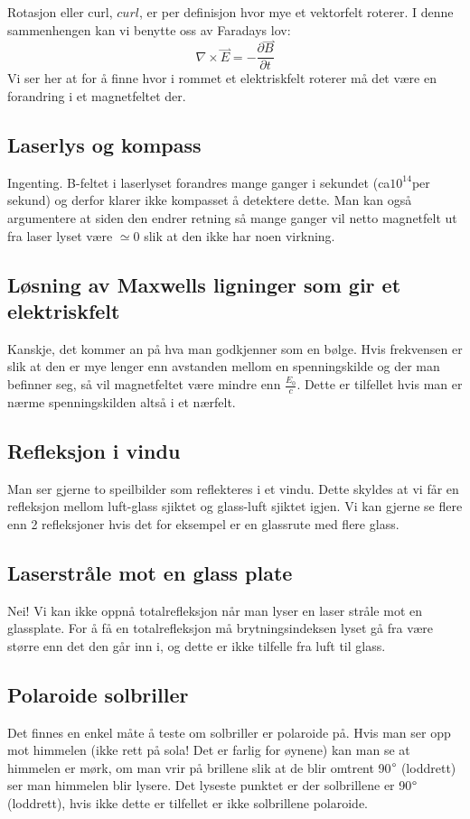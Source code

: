 \documentclass[a4paper,12pt,norsk]{article}
\newcommand{\ov}{\overset}
\begin{document}
Rotasjon eller curl, $curl$, er per definisjon hvor mye et vektorfelt roterer. I denne sammenhengen kan vi benytte oss av Faradays lov:
$$
\nabla \times \ov{\rightharpoonup}{E} = -\frac{\partial \ov{\rightharpoonup}{B}}{\partial t}
$$
Vi ser her at for å finne hvor i rommet et elektriskfelt roterer må det være en forandring i et magnetfeltet der. 

\subsection{Laserlys og kompass}
Ingenting. B-feltet i laserlyset forandres mange ganger i sekundet (ca$10^{14}$per sekund) og derfor klarer ikke kompasset å detektere dette. Man kan også argumentere at siden den endrer retning så mange ganger vil netto magnetfelt ut fra laser lyset være $\simeq 0$ slik at den ikke har noen virkning.

\subsection{Løsning av Maxwells ligninger som gir et elektriskfelt}
Kanskje, det kommer an på hva man godkjenner som en bølge. Hvis frekvensen er slik at den er mye lenger enn avstanden mellom en spenningskilde og der man befinner seg, så vil magnetfeltet være mindre enn $\frac{E_0}{c}$. Dette er tilfellet hvis man er nærme spenningskilden altså i et nærfelt. 

\subsection{Refleksjon i vindu}
Man ser gjerne to speilbilder som reflekteres i et vindu. Dette skyldes at vi får en refleksjon mellom luft-glass sjiktet og glass-luft sjiktet igjen. Vi kan gjerne se flere enn 2 refleksjoner hvis det for eksempel er en glassrute med flere glass. 

\subsection{Laserstråle mot en glass plate}
Nei! Vi kan ikke oppnå totalrefleksjon når man lyser en laser stråle mot en glassplate. For å få en totalrefleksjon må brytningsindeksen lyset gå fra være større enn det den går inn i, og dette er ikke tilfelle fra luft til glass. 

\subsection{Polaroide solbriller}
Det finnes en enkel måte å teste om solbriller er polaroide på. Hvis man ser opp mot himmelen (ikke rett på sola! Det er farlig for øynene) kan man se at himmelen er mørk, om man vrir på brillene slik at de blir omtrent 90$\degree$ (loddrett) ser man himmelen blir lysere. Det lyseste punktet er der solbrillene er 90$\degree$ (loddrett), hvis ikke dette er tilfellet er ikke solbrillene polaroide.
\end{document}
